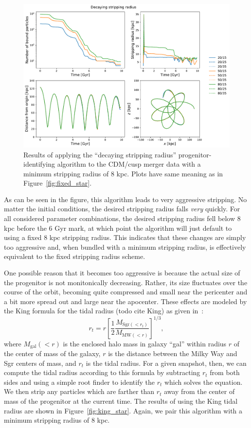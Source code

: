 \begin{figure}
    \centering
    \includegraphics[width=0.9\linewidth]{figs/decay_star.pdf}
    \caption{%
        Results of applying the ``decaying stripping radius''
        progenitor-identifying algorithm to the CDM/cusp merger data with a
        minimum stripping radius of 8 kpc.  Plots have same meaning as in
        Figure~\ref{fig:fixed_star}.
    }
    \label{fig:decay_star}
\end{figure}

As can be seen in the figure, this algorithm leads to very aggressive stripping.
No matter the initial conditions, the desired stripping radius falls
\textit{very} quickly. For all considered parameter combinations, the desired
stripping radius fell below 8 kpc before the 6 Gyr mark, at which point the
algorithm will just default to using a fixed 8 kpc stripping radius. This
indicates that these changes are simply too aggressive and, when bundled with a
minimum stripping radius, is effectively equivalent to the fixed stripping
radius scheme.

One possible reason that it becomes too aggressive is because the actual
size of the progenitor is not monitonically decreasing.  Rather, its size
fluctuates over the course of the orbit, becoming quite compressed and small
near the pericenter and a bit more spread out and large near the apocenter.
These effects are modeled by the King formula for the tidal radius (todo cite
King) as given in~\cite{dierickx_predicted_2017}:
\begin{equation} \label{eq:king_radius}
    r_t = r \left[ \frac{1}{2} 
    \frac{M_{\text{Sgr}(<r_t)}}{M_{\text{MW}(<r)}} \right]^{1/3},
\end{equation}
where $M_{\text{gal}}(<r)$ is the enclosed halo mass in galaxy ``gal'' within
radius $r$ of the center of mass of the galaxy, $r$ is the distance between
the Milky Way and Sgr centers of mass, and $r_t$ is the tidal radius.  For a
given snapshot, then, we can compute the tidal radius according to this
formula by subtracting $r_t$ from both sides and using a simple root finder to
identify the $r_t$ which solves the equation.  We then strip any particles
which are farther than $r_t$ away from the center of mass of the progenitor at
the current time. The results of using the King tidal radius are shown in
Figure~\ref{fig:king_star}. Again, we pair this algorithm with a minimum
stripping radius of 8 kpc.

